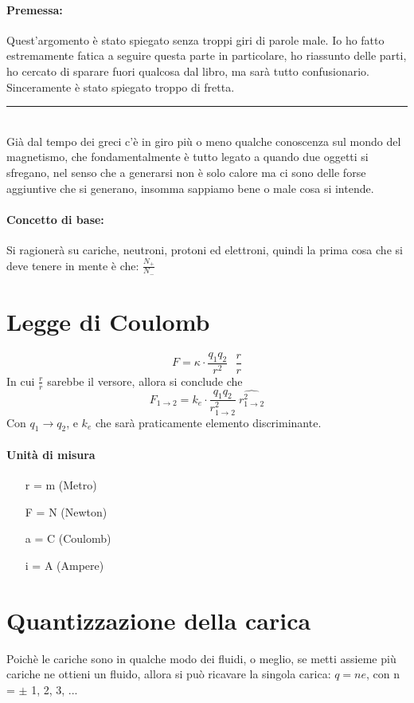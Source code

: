 \documentclass[12pt, a4paper, openany, oneside]{book}
\begin{document}
\paragraph{Premessa: }Quest'argomento è stato spiegato senza troppi giri di parole
male. Io ho fatto estremamente fatica a seguire questa parte in particolare, ho
riassunto delle parti, ho cercato di sparare fuori qualcosa dal libro, ma 
sarà tutto confusionario. Sinceramente è stato spiegato troppo di fretta.
\\
{\color{black} \rule{\linewidth}{0.3mm} }
\\
Già dal tempo dei greci c'è in giro più o meno qualche conoscenza sul mondo del
magnetismo, che fondamentalmente è tutto legato a quando due oggetti si 
sfregano, nel senso che a generarsi non è solo calore ma ci sono delle forse 
aggiuntive che si generano, insomma sappiamo bene o male cosa si intende.
\paragraph{Concetto di base: }Si ragionerà su cariche, neutroni, protoni
ed elettroni, quindi la prima cosa che si deve tenere in mente è che: 
$\frac{N_{+}}{N_{-}}$ 
\section{Legge di Coulomb}
\[
F = \kappa \cdot \frac{q_{1} q_{2}}{r^{2}} ~~~ \frac{r}{r}
\]		
In cui $\frac{r}{r}$ sarebbe il versore, allora si conclude che
\[
F_{1 \to 2} = k_{e} \cdot \frac{q_{1} q_{2}}{r^{2}_{1 \to 2}} ~ \widehat{r^{2}_{1 \to 2}}	
\]     
Con $q_{1} \to q_{2}$, e $k_{e}$ che sarà praticamente elemento discriminante. 
\paragraph{Unità di misura}
\begin{itemize}
	\item [r] = m (Metro)
	\item [F] = N (Newton)
	\item [a] = C (Coulomb)
	\item [i] = A (Ampere)
\end{itemize}
\section{Quantizzazione della carica}
Poichè le cariche sono in qualche modo dei fluidi, o meglio, se metti assieme
più cariche ne ottieni un fluido, allora si può ricavare la singola carica:
$q=ne$, con n = $\pm$ 1, 2, 3, ...\\
\end{document}
